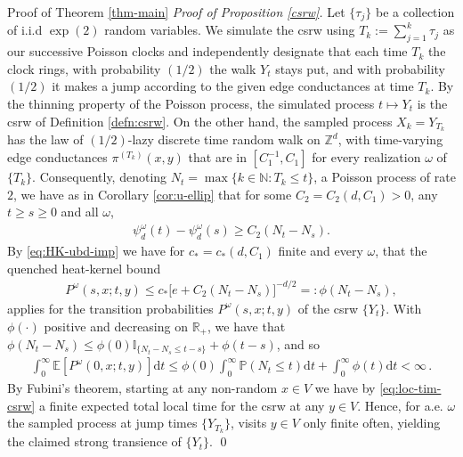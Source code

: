 \documentclass[12pt,reqno]{amsart}
\numberwithin{equation}{section}
\theoremstyle{definition}
\begin{document}
\begin{section}{Proof of Theorem \ref{thm-main}}
\medskip
\noindent
{\emph{Proof of Proposition \ref{csrw}.}} 
Let $\{\tau_j\}$ be a collection of i.i.d $\exp(2)$ random  variables. We
simulate the {{\sc\lowercase{{CSRW}}}} using $T_k:=\sum_{j=1}^k \tau_j$ as our successive Poisson clocks and independently designate that each time $T_k$ the clock rings,  with probability $(1/2)$ the walk $Y_t$ stays put, and 
with probability $(1/2)$ it makes a jump according to 
the given edge conductances at time $T_k$. 
By the thinning property of the Poisson process, the simulated 
process $t \mapsto Y_t$ is the {{\sc\lowercase{{CSRW}}}} of Definition \ref{defn:csrw}. 
On the other hand, the sampled process $X_k=Y_{T_k}$ has the law of
$(1/2)$-lazy discrete time random walk on ${\mathbb{Z}}^d$, with time-varying edge conductances $\pi^{(T_k)}(x,y)$ that are in $[C_1^{-1},C_1]$ for 
every realization $\omega$ of $\{T_k\}$. Consequently, 
denoting $N_t=\max\{k\in\mathbb{N}: T_k\le t\}$, a Poisson process
of rate $2$, we have as in Corollary \ref{cor:u-ellip} 
that for some $C_2=C_2(d,C_1)>0$, any $t \ge s \ge 0$ and all $\omega$, 
\begin{align*}
\psi^\omega_d(t)-\psi^\omega_d(s)\ge C_2(N_t-N_s).
\end{align*}
By \eqref{eq:HK-ubd-imp} we have for $c_\ast=c_\ast(d,C_1)$ finite 
and every $\omega$, that the quenched heat-kernel bound  
\begin{align}\label{eq:quenched-hk-ubd}
{P^\omega(s,x;t,y)\le c_\ast\big[ e+C_2(N_t-N_s)
\big]^{-d/2}=:\phi(N_t-N_s),}
\end{align}
applies for the transition probabilities $P^\omega(s,x;t,y)$ 
of the {{\sc\lowercase{{CSRW}}}} $\{Y_t\}$.
With $\phi(\cdot)$ positive and decreasing on ${\mathbb{R}}_+$, we have that 
$\phi(N_t-N_s) \le 
\phi(0) {\mathbb I}_{\{N_t - N_s \le t-s\}} + \phi(t-s)$, and so 
\begin{align}\label{eq:loc-tim-csrw}
\int_0^\infty {\mathbb{E}}[P^\omega(0,x;t,y)] \mathrm{d} t 
\le 
\phi(0) \int_0^\infty {\mathbb{P}}(N_t \le t) \mathrm{d} t 
+ \int_0^\infty \phi(t) \mathrm{d}t < \infty \,.
\end{align}
By Fubini's theorem, starting at any non-random $x \in V$
we have by \eqref{eq:loc-tim-csrw} a
finite expected total local time for the {{\sc\lowercase{{csrw}}}} 
at any $y \in V$. Hence, for a.e. $\omega$ the 
sampled process at jump times $\{Y_{T_k}\}$, 
visits $y \in V$ only finite often, yielding the claimed 
strong transience of $\{Y_t\}$.
\qed


\end{section}
\end{document}
